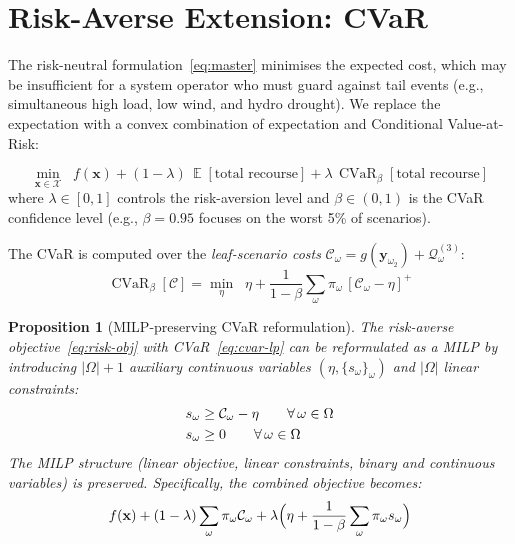 \documentclass[11pt]{article}
\DeclareMathOperator{\CVaR}{CVaR}
\DeclareMathOperator*{\E}{\mathbb{E}}
\newtheorem{proposition}{Proposition}
\begin{document}
\section{Risk-Averse Extension: CVaR}\label{sec:cvar}

The risk-neutral formulation~\eqref{eq:master} minimises the expected
cost, which may be insufficient for a system operator who must guard
against tail events (e.g., simultaneous high load, low wind, and
hydro drought). We replace the expectation with a convex combination
of expectation and Conditional Value-at-Risk:

\begin{equation}\label{eq:risk-obj}
\boxed{
  \min_{\mathbf{x} \in \mathcal{X}}\;\;
  f(\mathbf{x})
  + (1-\lambda)\,\E[\text{total recourse}]
  + \lambda\,\CVaR_\beta[\text{total recourse}]
}
\end{equation}
where $\lambda \in [0,1]$ controls the risk-aversion level and
$\beta \in (0,1)$ is the CVaR confidence level (e.g., $\beta = 0.95$
focuses on the worst 5\% of scenarios).

The CVaR is computed over the \emph{leaf-scenario costs}
$\mathcal{C}_\omega = g(\mathbf{y}_{\omega_2})
+ \mathcal{Q}^{(3)}_\omega$:
\begin{equation}\label{eq:cvar-lp}
  \CVaR_\beta[\mathcal{C}]
  = \min_{\eta}\;\;
  \eta + \frac{1}{1-\beta}\sum_{\omega} \pi_\omega\,
  [\mathcal{C}_\omega - \eta]^+
\end{equation}

\begin{proposition}[MILP-preserving CVaR reformulation]
\label{prop:cvar-milp}
The risk-averse objective~\eqref{eq:risk-obj} with
CVaR~\eqref{eq:cvar-lp} can be reformulated as a MILP by
introducing $|\Omega| + 1$ auxiliary continuous variables
$(\eta, \{s_\omega\}_\omega)$ and $|\Omega|$ linear constraints:
\begin{align}
  s_\omega &\geq \mathcal{C}_\omega - \eta
    \qquad \forall\, \omega \in \Omega
    \label{eq:cvar-aux} \\
  s_\omega &\geq 0
    \qquad \forall\, \omega \in \Omega \notag
\end{align}
The MILP structure (linear objective, linear constraints, binary and
continuous variables) is preserved. Specifically, the combined
objective becomes:
\begin{equation}\label{eq:risk-combined}
  f(\mathbf{x})
  + (1-\lambda) \sum_\omega \pi_\omega \mathcal{C}_\omega
  + \lambda \Bigl(\eta + \frac{1}{1-\beta} \sum_\omega
    \pi_\omega s_\omega\Bigr)
\end{equation}
\end{proposition}
\end{document}
